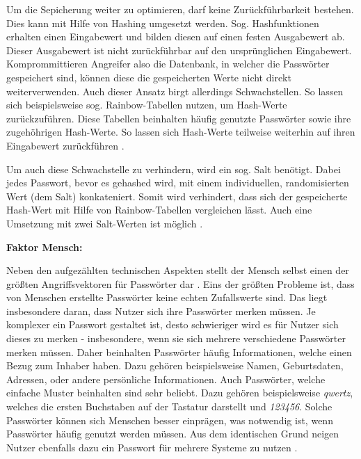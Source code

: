     Um die Sepicherung weiter zu optimieren, darf keine Zurückführbarkeit bestehen. Dies kann mit Hilfe von Hashing umgesetzt werden. Sog. Hashfunktionen erhalten einen Eingabewert und bilden diesen auf einen festen Ausgabewert ab. Dieser Ausgabewert ist nicht zurückführbar auf den ursprünglichen Eingabewert. Komprommittieren Angreifer also die Datenbank, in welcher die Passwörter gespeichert sind, können diese die gespeicherten Werte nicht direkt weiterverwenden. Auch dieser Ansatz birgt allerdings Schwachstellen. So lassen sich beispielsweise sog. Rainbow-Tabellen nutzen, um Hash-Werte zurückzuführen. Diese Tabellen beinhalten häufig genutzte Passwörter sowie ihre zugehöhrigen Hash-Werte. So lassen sich Hash-Werte teilweise weiterhin auf ihren Eingabewert zurückführen \cite{chanda2016password}.

    Um auch diese Schwachstelle zu verhindern, wird ein sog. Salt benötigt. Dabei jedes Passwort, bevor es gehashed wird, mit einem individuellen, randomisierten Wert (dem Salt) konkateniert. Somit wird verhindert, dass sich der gespeicherte Hash-Wert mit Hilfe von Rainbow-Tabellen vergleichen lässt. Auch eine Umsetzung mit zwei Salt-Werten ist möglich \cite{chanda2016password}.

\textbf{Faktor Mensch:}

Neben den aufgezählten technischen Aspekten stellt der Mensch selbst einen der größten Angriffsvektoren für Passwörter dar \cite{ives2004domino} \cite{yildirim2019encouraging}. Eins der größten Probleme ist, dass von Menschen erstellte Passwörter keine echten Zufallswerte sind. Das liegt insbesondere daran, dass Nutzer sich ihre Passwörter merken müssen. Je komplexer ein Passwort gestaltet ist, desto schwieriger wird es für Nutzer sich dieses zu merken - insbesondere, wenn sie sich mehrere verschiedene Passwörter merken müssen. Daher beinhalten Passwörter häufig Informationen, welche einen Bezug zum Inhaber haben. Dazu gehören beispielsweise Namen, Geburtsdaten, Adressen, oder andere persönliche Informationen. Auch Passwörter, welche einfache Muster beinhalten sind sehr beliebt. Dazu gehören beispielsweise \textit{qwertz}, welches die ersten Buchstaben auf der Tastatur darstellt und \textit{123456}. Solche Passwörter können sich Menschen besser einprägen, was notwendig ist, wenn Passwörter häufig genutzt werden müssen. Aus dem identischen Grund neigen Nutzer ebenfalls dazu ein Passwort für mehrere Systeme zu nutzen \cite{chanda2016password} \cite{boonkrong2012security} \cite{yildirim2019encouraging}. 

